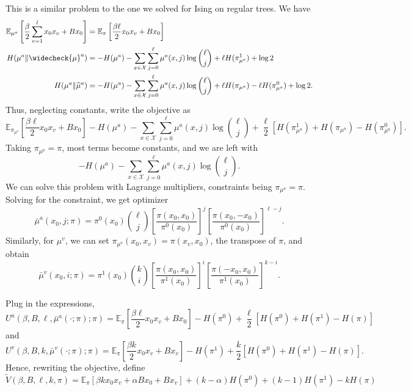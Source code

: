 \documentclass[12pt]{article}
\numberwithin{equation}{section}
\begin{document}
This is a similar problem to the one we solved for Ising on regular trees. We have
\begin{align*}
    \mathbb{E}_{\mu^a}\left[\frac\beta2\sum_{v=1}^l x_0x_v + B x_0\right] & = \mathbb{E}_\pi\left[\frac{\beta\ell}{2}x_0 x_v+Bx_0\right]                                                                        \\
    H(\mu^a\|\widecheck{\mu}^a)                                           & = -H(\mu^a)-\sum_{x\in\mathcal{X}}\sum_{j=0}^\ell\mu^a(x, j)\log{\ell\choose j} +\ell H(\pi_{\mu^a}^1)  + \log2                     \\
    H(\mu^a\|\widehat{\mu}^a)                                             & = -H(\mu^a)-\sum_{x\in\mathcal{X}}\sum_{j=0}^\ell\mu^a(x, j)\log{\ell\choose j} +\ell H(\pi_{\mu^a})-\ell H(\pi_{\mu^a}^0) + \log2.
\end{align*}
Thus, neglecting constants, write the objective as
\begin{equation*}
    \mathbb{E}_{\pi_{\mu^a}}\left[\frac{\beta\ell}{2}x_0 x_v+Bx_0\right] - H(\mu^a) -\sum_{x\in\mathcal{X}}\sum_{j=0}^\ell\mu^a(x, j)\log{\ell\choose j} + \frac\ell2\left[H(\pi_{\mu^a}^1)+H(\pi_{\mu^a})-H(\pi_{\mu^a}^0)\right].
\end{equation*}
Taking $\pi_{\mu^a}=\pi$, most terms become constants, and we are left with
\begin{equation*}
    - H(\mu^a) -\sum_{x\in\mathcal{X}}\sum_{j=0}^\ell\mu^a(x, j)\log{\ell\choose j}.
\end{equation*}
We can solve this problem with Lagrange multipliers, constraints being $\pi_{\mu^a}=\pi$. Solving for the constraint, we get optimizer
\begin{equation}
    \bar{\mu}^a(x_0, j; \pi) = \pi^0(x_0){\ell\choose j}\left[\frac{\pi(x_0,x_0)}{\pi^0(x_0)}\right]^j\left[\frac{\pi(x_0,-x_0)}{\pi^0(x_0)}\right]^{\ell-j}.
\end{equation}
Similarly, for $\mu^v$, we can set $\pi_{\mu^v}(x_0, x_v) = \pi(x_v, x_0)$, the transpose of $\pi$, and obtain
\begin{equation}
    \bar{\mu}^v(x_0, i; \pi) = \pi^1(x_0){k\choose i}\left[\frac{\pi(x_0,x_0)}{\pi^1(x_0)}\right]^i\left[\frac{\pi(-x_0,x_0)}{\pi^1(x_0)}\right]^{k-i}.
\end{equation}

Plug in the expressions,
\begin{equation}
    U^a(\beta, B, \ell, \bar{\mu}^a(\cdot; \pi); \pi) = \mathbb{E}_{\pi}\left[\frac{\beta\ell}{2}x_0 x_v+Bx_0\right]-H(\pi^0)+\frac\ell2\left[H(\pi^0)+H(\pi^1)-H(\pi)\right]
\end{equation}
and
\begin{equation}
    U^v(\beta, B, k, \bar{\mu}^v(\cdot; \pi); \pi) = \mathbb{E}_{\pi}\left[\frac{\beta k}{2}x_0 x_v+Bx_v\right]-H(\pi^1)+\frac{k}{2}\left[H(\pi^0)+H(\pi^1)-H(\pi)\right].
\end{equation}
Hence, rewriting the objective, define
\begin{equation}
    \widetilde{V}(\beta, B, \ell, k, \pi) = \mathbb{E}_{\pi}\left[\beta k x_0 x_v + \alpha Bx_0 + B x_v\right] + (k-\alpha)H(\pi^0) + (k-1)H(\pi^1) - kH(\pi)
\end{equation}
\end{document}
